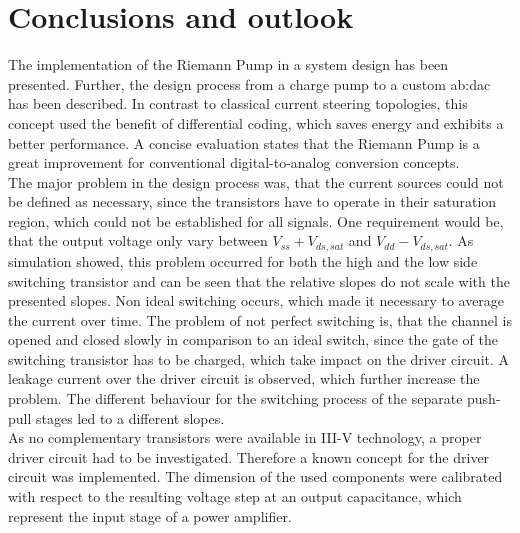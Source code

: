 \chapter{Conclusions and outlook}
The implementation of the Riemann Pump in a system design has been presented.
Further, the design process from a charge pump to a custom \gls{ab:dac} has been described.
In contrast to classical current steering topologies, this concept used the benefit of differential coding, which saves energy and exhibits a better performance.
A concise evaluation states that the Riemann Pump is a great improvement for conventional digital-to-analog conversion concepts.\\
The major problem in the design process was, that the current sources could not be defined as necessary, since the transistors have to operate in their saturation region, which could not be established for all signals.
One requirement would be, that the output voltage only vary between $V_{ss} + V_{ds,sat}$ and $V_{dd} - V_{ds,sat}$.
As simulation showed, this problem occurred for both the high and the low side switching transistor and can be seen that the relative slopes do not scale with the presented slopes.
Non ideal switching occurs, which made it necessary to average the current over time.
The problem of not perfect switching is, that the channel is opened and closed slowly in comparison to an ideal switch, since the gate of the switching transistor has to be charged, which take impact on the driver circuit.
A leakage current over the driver circuit is observed, which further increase the problem.
The different behaviour for the switching process of the separate push-pull stages led to a different slopes. \\
As no complementary transistors were available in III-V technology, a proper driver circuit had to be investigated.
Therefore a known concept \cite{MaksimovicPaper} for the driver circuit was implemented.
The dimension of the used components were calibrated with respect to the resulting voltage step at an output capacitance, which represent the input stage of a power amplifier.
